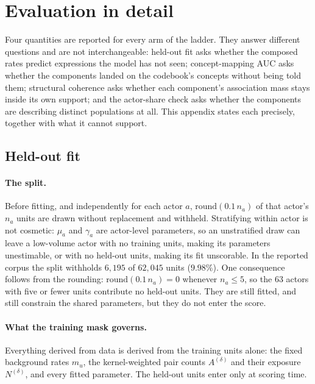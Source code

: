 \section{Evaluation in detail}\label{app:evaluation}

Four quantities are reported for every arm of the ladder. They answer different
questions and are not interchangeable: held-out fit asks whether the composed rates
predict expressions the model has not seen; concept-mapping AUC asks whether the
components landed on the codebook's concepts without being told them; structural
coherence asks whether each component's association mass stays inside its own support;
and the actor-share check asks whether the components are describing distinct
populations at all. This appendix states each precisely, together with what it cannot
support.

\subsection{Held-out fit}\label{app:heldout}

\paragraph{The split.} Before fitting, and independently for each actor $a$,
$\mathrm{round}(0.1\,n_a)$ of that actor's $n_a$ units are drawn without replacement and
withheld. Stratifying within actor is not cosmetic: $\mu_a$ and $\gamma_a$ are
actor-level parameters, so an unstratified draw can leave a low-volume actor with no
training units, making its parameters unestimable, or with no held-out units, making its
fit unscorable. In the reported corpus the split withholds $6{,}195$ of $62{,}045$ units
($9.98\%$). One consequence follows from the rounding: $\mathrm{round}(0.1\,n_a)=0$
whenever $n_a\le 5$, so the $63$ actors with five or fewer units contribute no held-out
units. They are still fitted, and still constrain the shared parameters, but they do not
enter the score.

\paragraph{What the training mask governs.} Everything derived from data is derived from
the training units alone: the fixed background rates $m_u$, the kernel-weighted pair
counts $A^{(\delta)}$ and their exposure $N^{(\delta)}$, and every fitted parameter. The
held-out units enter only at scoring time.

